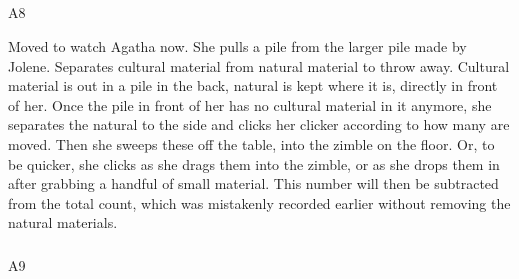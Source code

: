 \documentclass[
  canadian,
]{article}
\makeatletter
\let\oldsubparagraph\subparagraph
\renewcommand{\subparagraph}{
    \@ifstar
      \xxxSubParagraphStar
      \xxxSubParagraphNoStar
  }
\newcommand{\xxxSubParagraphStar}[1]{\oldsubparagraph*{#1}\mbox{}}
\newcommand{\xxxSubParagraphNoStar}[1]{\oldsubparagraph{#1}\mbox{}}
\makeatother
\begin{document}
\subparagraph{A8}\label{sec-A8}

Moved to watch Agatha now. She pulls a pile from the larger pile made by
Jolene. Separates cultural material from natural material to throw away.
Cultural material is out in a pile in the back, natural is kept where it
is, directly in front of her. Once the pile in front of her has no
cultural material in it anymore, she separates the natural to the side
and clicks her clicker according to how many are moved. Then she sweeps
these off the table, into the zimble on the floor. Or, to be quicker,
she clicks as she drags them into the zimble, or as she drops them in
after grabbing a handful of small material. This number will then be
subtracted from the total count, which was mistakenly recorded earlier
without removing the natural materials.

\subparagraph{A9}\label{sec-A9}
\end{document}
